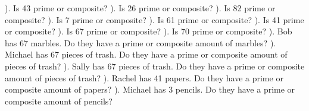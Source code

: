 \documentclass{article}%
\begin{document}
\newline%
). Is 43 prime or composite?%
\newline%
\newline%
). Is 26 prime or composite?%
\newline%
\newline%
). Is 82 prime or composite?%
\newline%
\newline%
). Is 7 prime or composite?%
\newline%
\newline%
). Is 61 prime or composite?%
\newline%
\newline%
). Is 41 prime or composite?%
\newline%
\newline%
). Is 67 prime or composite?%
\newline%
\newline%
). Is 70 prime or composite?%
\newline%
\newline%
). Bob has 67 marbles. Do they have a prime or composite amount of marbles?%
\newline%
\newline%
). Michael has 67 pieces of trash. Do they have a prime or composite amount of pieces of trash?%
\newline%
\newline%
). Sally has 67 pieces of trash. Do they have a prime or composite amount of pieces of trash?%
\newline%
\newline%
). Rachel has 41 papers. Do they have a prime or composite amount of papers?%
\newline%
\newline%
). Michael has 3 pencils. Do they have a prime or composite amount of pencils?%
\newline%
\end{document}
